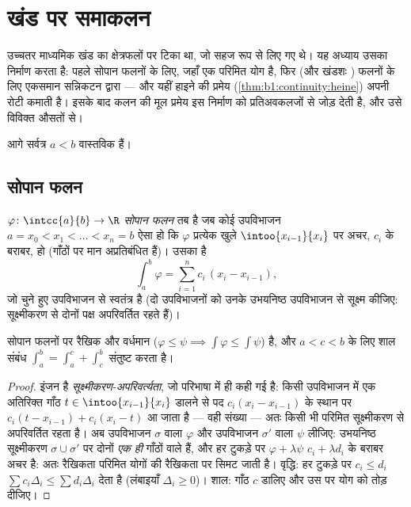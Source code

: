 \chapter{खंड पर समाकलन}\label{ch:b1:integration}

उच्चतर माध्यमिक खंड का  क्षेत्रफलों पर टिका था, जो सहज रूप से लिए गए
थे। यह अध्याय उसका निर्माण करता है: पहले सोपान फलनों के लिए, जहाँ  एक
परिमित योग है, फिर  (और खंडशः ) फलनों के लिए एकसमान सन्निकटन द्वारा
--- और यहीं हाइने की प्रमेय (\cref{thm:b1:continuity:heine}) अपनी रोटी कमाती
है। इसके बाद कलन की मूल प्रमेय इस निर्माण को प्रतिअवकलजों से जोड़ देती है,
और  उसे विविक्त औसतों से।

आगे सर्वत्र $a < b$ वास्तविक हैं।

\section{सोपान फलन}

\begin{definition}\label{def:b1:integration:step}
$\varphi \colon \intcc{a}{b} \to \R$ \emph{सोपान फलन} तब है
जब कोई उपविभाजन $a = x_0 < x_1 < \dots < x_n = b$ ऐसा हो कि $\varphi$
प्रत्येक खुले  $\intoo{x_{i-1}}{x_i}$ पर अचर, $c_i$ के बराबर, हो
(गाँठों पर मान अप्रतिबंधित हैं)। उसका  है
\[
\int_a^b \varphi = \sum_{i=1}^{n} c_i\,(x_i - x_{i-1}),
\]
जो चुने हुए उपविभाजन से स्वतंत्र है (दो उपविभाजनों को उनके उभयनिष्ठ उपविभाजन
से सूक्ष्म कीजिए: सूक्ष्मीकरण से दोनों पक्ष अपरिवर्तित रहते हैं)।
\end{definition}

\begin{proposition}\label{prop:b1:integration:stepprops}
सोपान फलनों पर  रैखिक और वर्धमान ($\varphi \leq \psi \implies
\int\varphi \leq \int\psi$) है, और $a < c < b$ के लिए शाल संबंध $\int_a^b =
\int_a^c + \int_c^b$ संतुष्ट करता है।
\end{proposition}

\begin{proof}
इंजन है \emph{सूक्ष्मीकरण-अपरिवर्त्यता}, जो परिभाषा में ही कही गई है: किसी
उपविभाजन में एक अतिरिक्त गाँठ $t \in \intoo{x_{i-1}}{x_i}$ डालने से पद
$c_i(x_i - x_{i-1})$ के स्थान पर $c_i(t - x_{i-1}) + c_i(x_i - t)$ आ जाता है
--- वही संख्या --- अतः किसी भी परिमित सूक्ष्मीकरण से  अपरिवर्तित रहता
है। अब उपविभाजन $\sigma$ वाला $\varphi$ और उपविभाजन $\sigma'$ वाला $\psi$
लीजिए: उभयनिष्ठ सूक्ष्मीकरण $\sigma \cup \sigma'$ पर दोनों \emph{एक ही}
गाँठों वाले  हैं, और हर टुकड़े पर $\varphi + \lambda\psi$ $c_i +
\lambda d_i$ के बराबर अचर है: अतः रैखिकता परिमित योगों की रैखिकता पर सिमट
जाती है। वृद्धि: हर टुकड़े पर $c_i \leq d_i$ $\sum c_i \Delta_i \leq \sum
d_i \Delta_i$ देता है (लंबाइयाँ $\Delta_i \geq 0$)। शाल: गाँठ $c$ डालिए और
उस पर योग को तोड़ दीजिए।
\end{proof}

